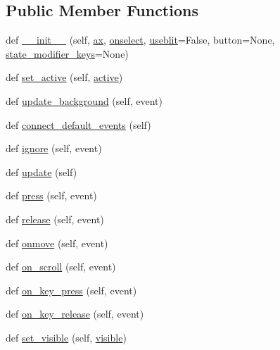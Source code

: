 \subsection*{Public Member Functions}
\begin{DoxyCompactItemize}
\item 
def \hyperlink{classmatplotlib_1_1widgets_1_1__SelectorWidget_a8f1d2504bdd325ccf589a825c3487276}{\+\_\+\+\_\+init\+\_\+\+\_\+} (self, \hyperlink{classmatplotlib_1_1widgets_1_1AxesWidget_ac0722858b7001d10a42055dc90420b4f}{ax}, \hyperlink{classmatplotlib_1_1widgets_1_1__SelectorWidget_ad893af1ad010d595c7cce1106b48d854}{onselect}, \hyperlink{classmatplotlib_1_1widgets_1_1__SelectorWidget_a6d178ef2dd7ec61c11b18302de3f43bf}{useblit}=False, button=None, \hyperlink{classmatplotlib_1_1widgets_1_1__SelectorWidget_ada64a11df65865f0f79e47f7c731b81c}{state\+\_\+modifier\+\_\+keys}=None)
\item 
def \hyperlink{classmatplotlib_1_1widgets_1_1__SelectorWidget_a5ded5af8e8d58455440314fb66f8981c}{set\+\_\+active} (self, \hyperlink{classmatplotlib_1_1widgets_1_1Widget_a6fc79b9a86770ee3a3b46ea419b7ad74}{active})
\item 
def \hyperlink{classmatplotlib_1_1widgets_1_1__SelectorWidget_adae5e2cfc421bceab639c5cb628f77fa}{update\+\_\+background} (self, event)
\item 
def \hyperlink{classmatplotlib_1_1widgets_1_1__SelectorWidget_abada5fd9fcf3324231da80e590ae605f}{connect\+\_\+default\+\_\+events} (self)
\item 
def \hyperlink{classmatplotlib_1_1widgets_1_1__SelectorWidget_ae53ea1215915929c2fc11ef7c8f5a1e4}{ignore} (self, event)
\item 
def \hyperlink{classmatplotlib_1_1widgets_1_1__SelectorWidget_aba9604e5c06d12a6b7953d1b025d539e}{update} (self)
\item 
def \hyperlink{classmatplotlib_1_1widgets_1_1__SelectorWidget_a696392044e06e7d8e058163d5f8b5a5e}{press} (self, event)
\item 
def \hyperlink{classmatplotlib_1_1widgets_1_1__SelectorWidget_a5fa061e6eb6ceb1657505b9c15917779}{release} (self, event)
\item 
def \hyperlink{classmatplotlib_1_1widgets_1_1__SelectorWidget_a73fa06e186b9dba44c75be2bfda85dc8}{onmove} (self, event)
\item 
def \hyperlink{classmatplotlib_1_1widgets_1_1__SelectorWidget_ab144a877d9f0121e1e628e39ff6b9361}{on\+\_\+scroll} (self, event)
\item 
def \hyperlink{classmatplotlib_1_1widgets_1_1__SelectorWidget_a36bc896cd1d5cd7bc872e2d6e288b985}{on\+\_\+key\+\_\+press} (self, event)
\item 
def \hyperlink{classmatplotlib_1_1widgets_1_1__SelectorWidget_ab3c82bf98245ac8686065f37bb488d93}{on\+\_\+key\+\_\+release} (self, event)
\item 
def \hyperlink{classmatplotlib_1_1widgets_1_1__SelectorWidget_a66d162aae4a37f9b0b79a578ef8182e6}{set\+\_\+visible} (self, \hyperlink{classmatplotlib_1_1widgets_1_1__SelectorWidget_a1549be0991202a41db2269fd07ad0a90}{visible})
\end{DoxyCompactItemize}
